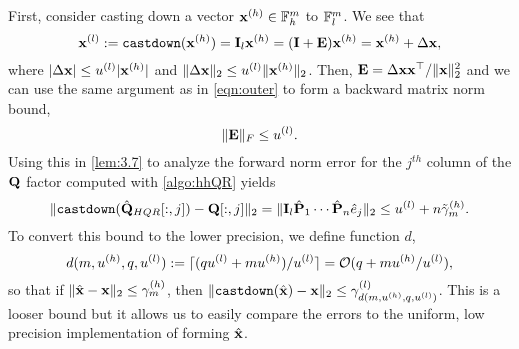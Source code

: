 First, consider casting down a vector $\mathbf{x}^{(h)}\in\mathbb{F}_h^m$ to $\mathbb{F}_l^m$.
We see that
\begin{equation}
	\mathbf{x}^{(l)} := \text{\tt castdown}(\mathbf{x}^{(h)}) = \mathbf{I}_{l}\mathbf{x}^{(h)} = (\mathbf{I}+\mathbf{E})\mathbf{x}^{(h)} = \mathbf{x}^{(h)}+\Delta \mathbf{x},
\end{equation}
where $|\Delta \mathbf{x}| \leq u^{(l)} |\mathbf{x}^{(h)}|$ and  $\|\Delta \mathbf{x}\|_2 \leq u^{(l)} \|\mathbf{x}^{(h)}\|_2$.
Then, $\mathbf{E} = \Delta \mathbf{x x}^{\top}/\|\mathbf{x}\|_2^2$ and we can use the same argument as in \cref{eqn:outer} to form a backward matrix norm bound, 
\begin{equation}
	\|\bb{E}\|_F\leq u^{(l)}. \label{eqn:castdown}
\end{equation}
Using this in \cref{lem:3.7} to analyze the forward norm error for the $j^{th}$ column of the $\mathbf{Q}$ factor computed with \cref{algo:hhQR} yields
\begin{equation}
	\|\text{\tt castdown}(\hat{\bb{Q}}_{HQR}[:,j]) - \bb{Q}[:,j]\|_2 = \|\bb{I}_l\hat{\bb{P}}_{1}\cdots\hat{\bb{P}}_{n}\hat{e}_j\|_2 \leq u^{(l)}+n\tilde{\gamma}_m^{(h)}.\label{eqn:HQR-mp}
\end{equation}
To convert this bound to the lower precision, we define function $d$,
\begin{equation}
d(m,u^{(h)}, q,u^{(l)}) := \lceil (qu^{(l)}+mu^{(h)})/u^{(l)}\rceil = \cO(q+mu^{(h)}/u^{(l)}),\label{eqn:d}
\end{equation} 
so that if $\|\hat{\mathbf{x}}-\mathbf{x}\|_2 \leq \gamma_m^{(h)}$, then $\|\text{\tt castdown}(\hat{\mathbf{x}})-\mathbf{x}\|_2 \leq \gamma_{d(m,u^{(h)}, q,u^{(l)})}^{(l)}$.
This is a looser bound but it allows us to easily compare the errors to the uniform, low precision implementation of forming $\hat{\mathbf{x}}$.
